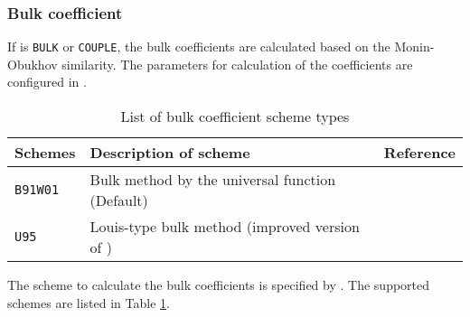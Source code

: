 \subsubsection{Bulk coefficient}
If  is \verb|BULK| or \verb|COUPLE|, the bulk coefficients are calculated based on the Monin-Obukhov similarity.
The parameters for calculation of the coefficients are configured in .

\begin{table}[h]
\begin{center}
  \caption{List of bulk coefficient scheme types}
  \label{tab:nml_bulk}
  \begin{tabularx}{150mm}{llX} \hline
    \rowcolor[gray]{0.9}  Schemes & Description of scheme & Reference\\ \hline
      \verb|B91W01| & Bulk method by the universal function (Default) & \citet{beljaars_1991,wilson_2001} \\
      \verb|U95|    & Louis-type bulk method  (improved version of \citet{louis_1979}) & \citet{uno_1995} \\
    \hline
  \end{tabularx}
\end{center}
\end{table}

The scheme to calculate the bulk coefficients is specified by .
The supported schemes are listed in Table \ref{tab:nml_bulk}.


